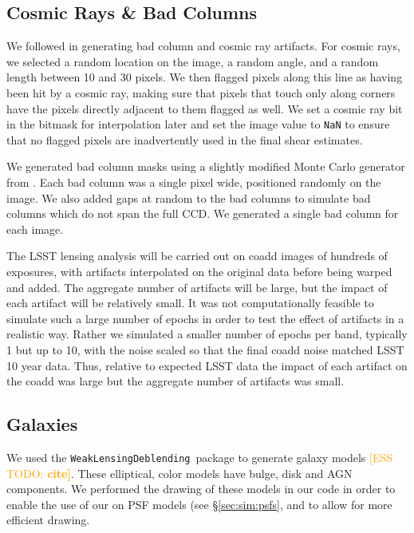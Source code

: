 \documentclass[iop, twocolappendix, appendixfloats, numberedappendix, apj]{hackemulateapj}
\newcommand{\esstodo}[1]{\textcolor{orange}{[ESS TODO: \bf #1]}}
\newcommand{\descwl}{\texttt{WeakLensingDeblending}}
\begin{document}
\subsection{Cosmic Rays \& Bad Columns} \label{sec:sim:cosmics_badcols}

We followed \citet{BeckerMdetCoadd} in generating bad column and cosmic ray artifacts.
For cosmic rays, we selected a random location on the image, a random angle, and a random
length between 10 and 30 pixels. We then flagged pixels along this line as having been hit
by a cosmic ray, making sure that pixels that touch only along corners have the pixels
directly adjacent to them flagged as well. We set a cosmic ray bit in the bitmask for
interpolation later and set the image value to \texttt{NaN} to ensure that no flagged
pixels are inadvertently used in the final shear estimates.

We generated bad column masks using a slightly modified Monte Carlo generator
from \citet{BeckerMdetCoadd}. Each bad column was a single pixel wide,
positioned randomly on the image. We also added gaps at random to the bad
columns to simulate bad columns which do not span the full CCD.  We generated
a single bad column for each image.

The LSST lensing analysis will be carried out on coadd images of hundreds of
exposures, with artifacts interpolated on the original data before being warped
and added.  The aggregate number of artifacts will be large, but the impact of
each artifact will be relatively small.  It was not computationally feasible to
simulate such a large number of epochs in order to test the effect of artifacts
in a realistic way.  Rather we simulated a smaller number of epochs per
band, typically
1 but up to 10, with the noise scaled so that the final coadd noise matched
LSST 10 year data.  Thus, relative to expected LSST data the impact of each
artifact on the coadd was large but the aggregate number of artifacts was
small.

\subsection{Galaxies} \label{sec:sim:galaxies}

We used the \descwl\ package to generate galaxy models \esstodo{cite}.  These
elliptical, color models have bulge, disk and AGN components. We performed the
drawing of these models in our code in order to enable the use of our on PSF
models (see \S \ref{sec:sim:psfs}, and to allow for more efficient drawing.
\end{document}
